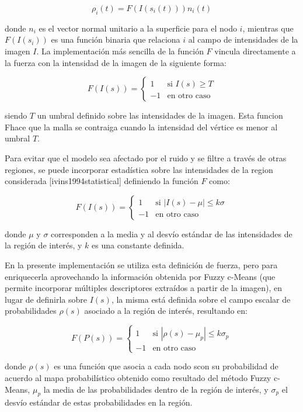$$ \rho_{i}(t) = F(I(s_{i}(t))) n_{i}(t) $$

donde $n_{i}$ es el vector normal unitario a la superficie para el nodo $i$, mientras que $F(I(s_{i}))$ es una función binaria que relaciona $i$ al campo de intensidades de la imagen $I$. La implementación más sencilla de la función $F$ vincula directamente a la fuerza con la intensidad de la imagen de la siguiente forma:

$$ F(I(s)) = \begin{cases} 1 & \text{si } I(s) \geq T \\ -1 & \text{en otro caso} \end{cases}  $$

siendo $T$ un umbral definido sobre las intensidades de la imagen. Esta funcion Fhace que la malla se contraiga cuando la intensidad del vértice es menor al umbral $T$.

Para evitar que el modelo sea afectado por el ruido y se filtre a través de otras regiones, se puede incorporar estadística sobre las intensidades de la region considerada [ivins1994statistical] definiendo la función $F$ como:

$$ F(I(s)) = \begin{cases} 1 & \text{si } \left|I(s) - \mu \right| \leq k\sigma \\ -1 & \text{en otro caso} \end{cases} $$

donde $\mu$ y $\sigma$ corresponden a la media y al desvío estándar de las intensidades de la región de interés, y $k$ es una constante definida.

En la presente implementación se utiliza esta definición de fuerza, pero para enriquecerla aprovechando la información obtenida por Fuzzy c-Means (que permite incorporar múltiples descriptores extraídos a partir de la imagen), en lugar de definirla sobre $I(s)$, la misma está definida sobre el campo escalar de probabilidades $\rho(s)$ asociado a la región de interés, resultando en:

$$ F(P(s)) = \begin{cases} 1 & \text{si } \left|\rho(s) - \mu_{p} \right| \leq k\sigma_{p} \\ -1 & \text{en otro caso} \end{cases}  $$

donde $\rho(s)$ es una función que asocia a cada nodo scon su probabilidad de acuerdo al mapa probabilístico obtenido como resultado del método Fuzzy c-Means, $\mu_{p}$ la media de las probabilidades dentro de la región de interés, y $\sigma_{p}$ el desvío estándar de estas probabilidades en la región.

